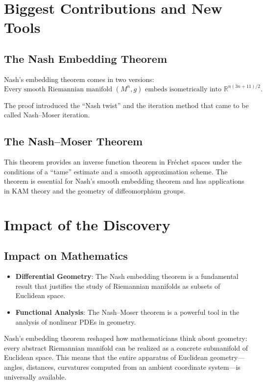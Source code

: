 \section{Biggest Contributions and New Tools}

\subsection{The Nash Embedding Theorem}

Nash's embedding theorem comes in two versions:
\[
\text{Every smooth Riemannian manifold } (M^n, g) \text{ embeds isometrically into } \mathbb{R}^{n(3n+11)/2}.
\]

The proof introduced the ``Nash twist'' and the iteration method that came to be called Nash--Moser iteration.

\subsection{The Nash--Moser Theorem}

This theorem provides an inverse function theorem in Fr\'echet spaces under the conditions of a ``tame'' estimate and a smooth approximation scheme. The theorem is essential for Nash's smooth embedding theorem and has applications in KAM theory and the geometry of diffeomorphism groups.

\section{Impact of the Discovery}

\subsection{Impact on Mathematics}

\begin{itemize}
\item \textbf{Differential Geometry}: The Nash embedding theorem is a fundamental result that justifies the study of Riemannian manifolds as subsets of Euclidean space.

\item \textbf{Functional Analysis}: The Nash--Moser theorem is a powerful tool in the analysis of nonlinear PDEs in geometry.

\end{itemize}

\begin{whyitmatters}
Nash's embedding theorem reshaped how mathematicians think about geometry: every abstract Riemannian manifold can be realized as a concrete submanifold of Euclidean space. This means that the entire apparatus of Euclidean geometry---angles, distances, curvatures computed from an ambient coordinate system---is universally available.
\end{whyitmatters}

